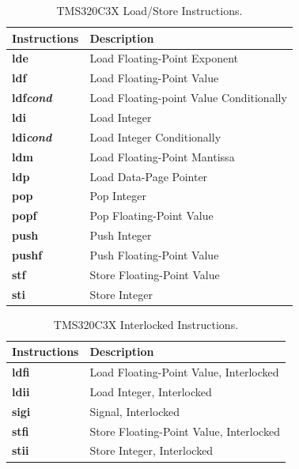 \begin{table}[!p]
\begin{center}
	\small
	\begin{tabular}{|p{3.0cm}|p{10.0cm}|}
	\hline
	\textbf{Instructions} & \textbf{Description}\\
	\hline
	\textbf{lde} & Load Floating-Point Exponent\\
	\hline
	\textbf{ldf} & Load Floating-Point Value\\
	\hline
	\textbf{ldf\textit{cond}} & Load Floating-point Value Conditionally\\
	\hline
	\textbf{ldi} & Load Integer\\
	\hline
	\textbf{ldi\textit{cond}} & Load Integer Conditionally\\
	\hline
	\textbf{ldm} & Load Floating-Point Mantissa\\
	\hline
	\textbf{ldp} & Load Data-Page Pointer\\
	\hline
	\textbf{pop} & Pop Integer\\
	\hline
	\textbf{popf} & Pop Floating-Point Value\\
	\hline
	\textbf{push} & Push Integer\\
	\hline
	\textbf{pushf} & Push Floating-Point Value\\
	\hline
	\textbf{stf} & Store Floating-Point Value\\
	\hline
	\textbf{sti} & Store Integer\\
	\hline
	\end{tabular}
	\caption{\label{table:tms320c3x_load_store_instructions} TMS320C3X Load/Store Instructions.}
\end{center}
\end{table}

\begin{table}[!p]
\begin{center}
	\small
	\begin{tabular}{|p{3.0cm}|p{10.0cm}|}
	\hline
	\textbf{Instructions} & \textbf{Description}\\
	\hline
	\textbf{ldfi} & Load Floating-Point Value, Interlocked\\
	\hline
	\textbf{ldii} & Load Integer, Interlocked\\
	\hline
	\textbf{sigi} & Signal, Interlocked\\
	\hline
	\textbf{stfi} & Store Floating-Point Value, Interlocked\\
	\hline
	\textbf{stii} & Store Integer, Interlocked\\
	\hline
	\end{tabular}
	\caption{\label{table:tms320c3x_interlocked_instructions} TMS320C3X Interlocked Instructions.}
\end{center}
\end{table}

